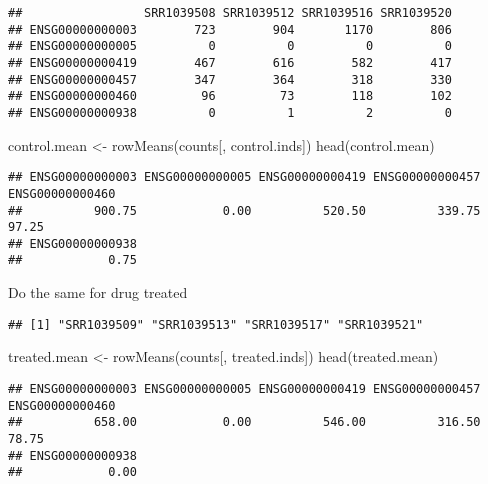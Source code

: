\documentclass[
]{article}
\newenvironment{Shaded}{\begin{snugshade}}{\end{snugshade}}
\newcommand{\FunctionTok}[1]{\textcolor[rgb]{0.00,0.00,0.00}{#1}}
\newcommand{\NormalTok}[1]{#1}
\newcommand{\OtherTok}[1]{\textcolor[rgb]{0.56,0.35,0.01}{#1}}
\newcommand{\SpecialCharTok}[1]{\textcolor[rgb]{0.00,0.00,0.00}{#1}}
\newcommand{\StringTok}[1]{\textcolor[rgb]{0.31,0.60,0.02}{#1}}
\begin{document}
\begin{verbatim}
##                 SRR1039508 SRR1039512 SRR1039516 SRR1039520
## ENSG00000000003        723        904       1170        806
## ENSG00000000005          0          0          0          0
## ENSG00000000419        467        616        582        417
## ENSG00000000457        347        364        318        330
## ENSG00000000460         96         73        118        102
## ENSG00000000938          0          1          2          0
\end{verbatim}

\begin{Shaded}
\begin{Highlighting}[]
\NormalTok{control.mean }\OtherTok{\textless{}{-}} \FunctionTok{rowMeans}\NormalTok{(counts[, control.inds])}
\FunctionTok{head}\NormalTok{(control.mean)}
\end{Highlighting}
\end{Shaded}

\begin{verbatim}
## ENSG00000000003 ENSG00000000005 ENSG00000000419 ENSG00000000457 ENSG00000000460 
##          900.75            0.00          520.50          339.75           97.25 
## ENSG00000000938 
##            0.75
\end{verbatim}

Do the same for drug treated

\begin{Shaded}
\end{Shaded}

\begin{verbatim}
## [1] "SRR1039509" "SRR1039513" "SRR1039517" "SRR1039521"
\end{verbatim}

\begin{Shaded}
\begin{Highlighting}[]
\NormalTok{treated.mean }\OtherTok{\textless{}{-}} \FunctionTok{rowMeans}\NormalTok{(counts[, treated.inds])}
\FunctionTok{head}\NormalTok{(treated.mean)}
\end{Highlighting}
\end{Shaded}

\begin{verbatim}
## ENSG00000000003 ENSG00000000005 ENSG00000000419 ENSG00000000457 ENSG00000000460 
##          658.00            0.00          546.00          316.50           78.75 
## ENSG00000000938 
##            0.00
\end{verbatim}
\end{document}
